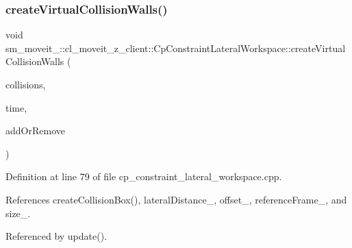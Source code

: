 \subsubsection{\texorpdfstring{create\+Virtual\+Collision\+Walls()}{createVirtualCollisionWalls()}}
{\footnotesize\ttfamily void sm\+\_\+moveit\+\_\+::cl\+\_\+moveit\+\_\+z\+\_\+client\+::\+Cp\+Constraint\+Lateral\+Workspace\+::create\+Virtual\+Collision\+Walls (\begin{DoxyParamCaption}\item[{std\+::vector$<$ moveit\+\_\+msgs\+::\+Collision\+Object $>$ \&}]{collisions,  }\item[{const ros\+::\+Time \&}]{time,  }\item[{int}]{add\+Or\+Remove }\end{DoxyParamCaption})}



Definition at line 79 of file cp\+\_\+constraint\+\_\+lateral\+\_\+workspace.\+cpp.



References create\+Collision\+Box(), lateral\+Distance\+\_\+, offset\+\_\+, reference\+Frame\+\_\+, and size\+\_\+.



Referenced by update().


